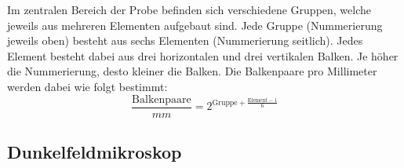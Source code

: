 \documentclass[ngerman]{scrartcl}
\begin{document}

Im zentralen Bereich der Probe befinden sich verschiedene Gruppen, welche jeweils aus mehreren Elementen aufgebaut sind. Jede Gruppe (Nummerierung jeweils oben) besteht aus sechs Elementen
(Nummerierung seitlich). Jedes Element besteht dabei aus drei horizontalen und drei vertikalen Balken. Je höher die Nummerierung, desto kleiner die Balken. Die Balkenpaare pro Millimeter werden dabei wie folgt bestimmt:
%
\begin{equation}
    \label{eq:aufloesungsvermoegen}
    \frac{\text{Balkenpaare}}{\si{mm}}=2^{\text{Gruppe}+\frac{\text{Element}-1}{6}}
\end{equation}


\subsection{Dunkelfeldmikroskop}
\label{subsec:dunkelfeldmikroskop_grundlagen}
\end{document}
